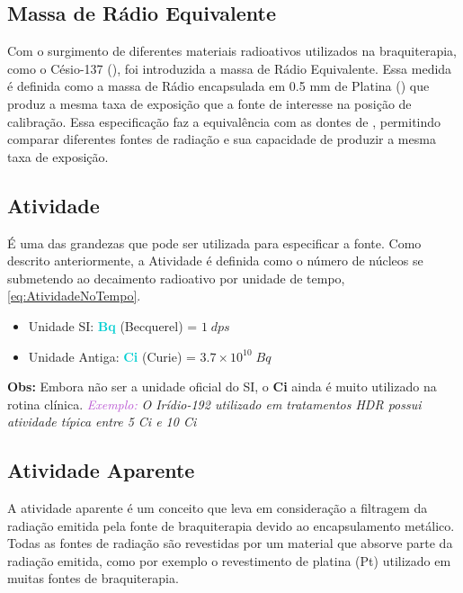 \documentclass[11pt,a4paper]{article}
\newcounter{exemplo}
\begin{document}
\subsection*{Massa de Rádio Equivalente}

	Com o surgimento de diferentes materiais radioativos utilizados na braquiterapia, como o Césio-137 (), foi introduzida a massa de Rádio Equivalente. Essa medida é definida como a massa de Rádio encapsulada em 0.5 mm de Platina () que produz a mesma taxa de exposição que a fonte de interesse na posição de calibração. Essa especificação faz a equivalência com as dontes de , permitindo comparar diferentes fontes de radiação e sua capacidade de produzir a mesma taxa de exposição.

\subsection*{Atividade}

	É uma das grandezas que pode ser utilizada para especificar a fonte. Como descrito anteriormente, a Atividade é definida como o número de núcleos se submetendo ao decaimento radioativo por unidade de tempo,   \ref{eq:AtividadeNoTempo}.

			\begin{itemize}
				\item Unidade SI: \textcolor{DarkTurquoise}{\textbf{Bq}} (Becquerel) = $1\;dps$
				\item Unidade Antiga: \textcolor{DarkTurquoise}{\textbf{Ci}} (Curie) = $3.7 \times 10^{10}\; Bq$
			\end{itemize}

			\textbf{\textbf{\textcolor{CarnationPink}{Obs:} } }Embora não ser a unidade oficial do SI, o \textbf{Ci} ainda é muito utilizado na rotina clínica. \textit{\textcolor{MediumOrchid}{Exemplo:}} \textit{O Irídio-192 utilizado em tratamentos HDR possui atividade típica entre 5 Ci e 10 Ci}

\subsection*{Atividade Aparente}

	A atividade aparente é um conceito que leva em consideração a filtragem da radiação emitida pela fonte de braquiterapia devido ao encapsulamento metálico. Todas as fontes de radiação são revestidas por um material que absorve parte da radiação emitida, como por exemplo o revestimento de platina (Pt) utilizado em muitas fontes de braquiterapia.
\end{document}
